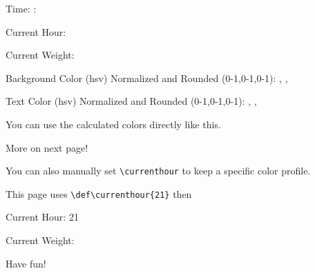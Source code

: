 \documentclass[12pt]{article}
\begin{document}

Time: :

Current Hour: \currenthour

Current Weight: 

Background Color (hsv) Normalized and Rounded (0-1,0-1,0-1): 
,
,

Text Color (hsv) Normalized and Rounded (0-1,0-1,0-1): 
,
,

\colorbox{documenttextcolor}{\textcolor{documentbackgroundcolor}{You can use the calculated colors directly like this.}}

More on next page!

\newpage

\def\currenthour{21}


You can also manually set \verb|\currenthour| to keep a specific color profile.

This page uses \verb|\def\currenthour{21}| then \verb||

Current Hour: \currenthour

Current Weight: 

Have fun!
\end{document}
